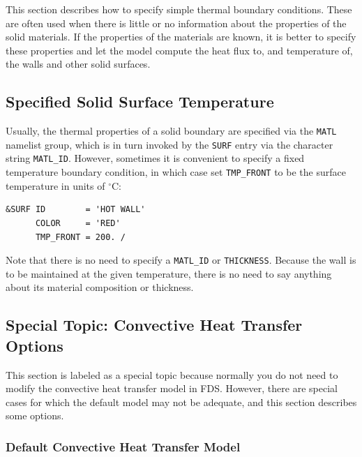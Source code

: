 \documentclass[11pt]{book}
\newcommand{\ct}{\tt\small}
\begin{document}
This section describes how to specify simple thermal boundary conditions. These are often used when there is little or no
information about the properties of the solid materials. If the properties of the materials are known, it is better to specify these
properties and let the model compute the heat flux to, and temperature of, the walls and other solid surfaces.


\subsection{Specified Solid Surface Temperature}
\label{info:specified_temperature}

Usually, the thermal properties of a solid boundary are specified via the
{\ct MATL} namelist group, which is in turn invoked by the {\ct SURF} entry via
the character string {\ct MATL\_ID}. However, sometimes it is convenient to
specify a fixed temperature boundary condition, in which case set
{\ct TMP\_FRONT} to be the surface temperature in units of $^\circ$C:

\footnotesize
\begin{verbatim}
&SURF ID        = 'HOT WALL'
      COLOR     = 'RED'
      TMP_FRONT = 200. /
\end{verbatim}
\normalsize

\noindent
Note that there is no need to specify a {\ct MATL\_ID} or {\ct THICKNESS}. Because the wall is to be maintained at the given temperature,
there is no need to say anything about its material composition or thickness.



\subsection{Special Topic: Convective Heat Transfer Options}
\label{info:convection}

This section is labeled as a special topic because normally you do not need to modify the convective heat transfer
model in FDS. However, there are special cases for which the default model may not be adequate, and this section
describes some options.

\subsubsection{Default Convective Heat Transfer Model}
\end{document}
